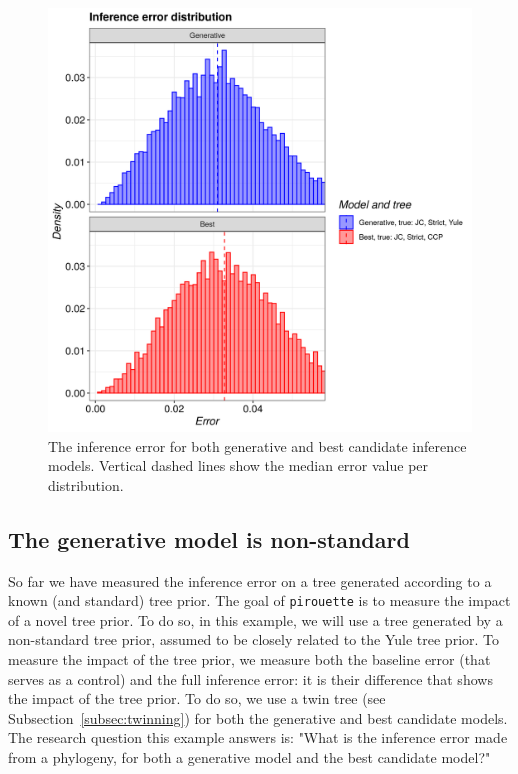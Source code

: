 \begin{figure}[H]
  \includegraphics[width=\textwidth]{example_2/errors.png}
  \caption{
    The inference error for both generative and best candidate inference models.
    Vertical dashed lines show the median error value per distribution.
  }
  \label{fig:example_2}
\end{figure}

\subsection{The generative model is non-standard}\label{Comparing to background noise}

So far we have measured the inference error on a tree
generated according to a known (and standard) tree prior. 
The goal of \verb;pirouette; is to measure the impact of a novel tree prior.
To do so, in this example, we will use a tree generated by a non-standard 
tree prior, assumed to be closely related to the Yule tree prior.
To measure the impact of the tree prior, we measure both the baseline 
error (that serves as a control) and the full inference error: it is their 
difference that shows the impact of the tree prior.
To do so, we use a twin tree (see Subsection~\ref{subsec:twinning}) for 
both the generative and best candidate models.
The research question this example answers is:
"What is the inference error made from a phylogeny, 
for both a generative model and the best candidate model?"

